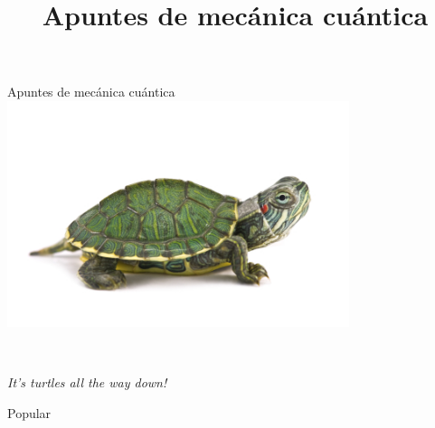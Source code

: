 \documentclass[a4paper,11pt,notitle]{report}
\title{Apuntes de mecánica cuántica}
\date{}
\begin{document}
\begin{titlepage}
  \centering
  \vfill
  {\Huge
    Apuntes de mecánica cuántica
    \vskip2cm
    \Large
    \textsc{}\\
    }
    \vfill
    \includegraphics[width=10cm]{turtle.jpg}
    \vfill
    \vfill
\end{titlepage}

\begin{flushright}
  \

  \vspace{3cm}

  \emph{
    It's turtles all the way down!}

  \sc Popular
\end{flushright}
\end{document}
